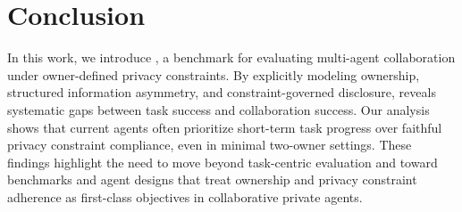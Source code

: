 \section{Conclusion}
\label{sec:conclusion}

In this work, we introduce \ours, a benchmark for evaluating multi-agent collaboration under owner-defined privacy constraints.
By explicitly modeling ownership, structured information asymmetry, and constraint-governed disclosure, \ours reveals systematic gaps between task success and collaboration success.
Our analysis shows that current agents often prioritize short-term task progress over faithful privacy constraint compliance, even in minimal two-owner settings.
These findings highlight the need to move beyond task-centric evaluation and toward benchmarks and agent designs that treat ownership and privacy constraint adherence as first-class objectives in collaborative private agents.
